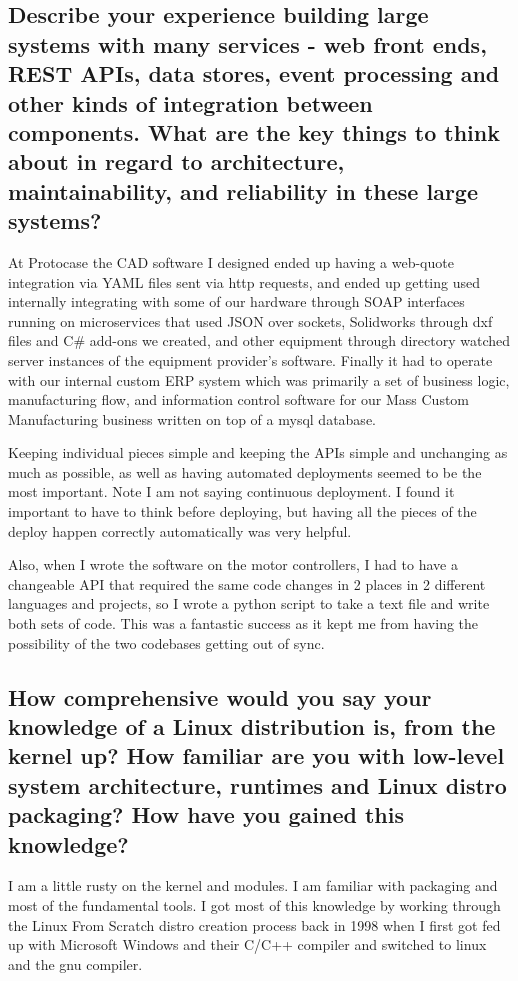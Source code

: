 \documentclass[letter,12pt]{article}
\begin{document}
\subsection{Describe your experience building large systems with many services - web front ends, REST APIs, data stores, event processing and other kinds of integration between components. What are the key things to think about in regard to architecture, maintainability, and reliability in these large systems?}
At Protocase the CAD software I designed ended up having a web-quote integration via YAML files sent via http requests, and ended up getting used internally integrating with some of our hardware through SOAP interfaces running on microservices that used JSON over sockets, Solidworks through dxf files and C\# add-ons we created, and other equipment through directory watched server instances of the equipment provider's software. Finally it had to operate with our internal custom ERP system which was primarily a set of business logic, manufacturing flow, and information control software for our Mass Custom Manufacturing business written on top of a mysql database.

Keeping individual pieces simple and keeping the APIs simple and unchanging as much as possible, as well as having automated deployments seemed to be the most important. Note I am not saying continuous deployment. I found it important to have to think before deploying, but having all the pieces of the deploy happen correctly automatically was very helpful.

Also, when I wrote the software on the motor controllers, I had to have a changeable API that required the same code changes in 2 places in 2 different languages and projects, so I wrote a python script to take a text file and write both sets of code. This was a fantastic success as it kept me from having the possibility of the two codebases getting out of sync.


\subsection{How comprehensive would you say your knowledge of a Linux distribution is, from the kernel up? How familiar are you with low-level system architecture, runtimes and Linux distro packaging? How have you gained this knowledge?}
I am a little rusty on the kernel and modules. I am familiar with packaging and most of the fundamental tools. I got most of this knowledge by working through the Linux From Scratch distro creation process back in 1998 when I first got fed up with Microsoft Windows and their C/C++ compiler and switched to linux and the gnu compiler.
\end{document}

